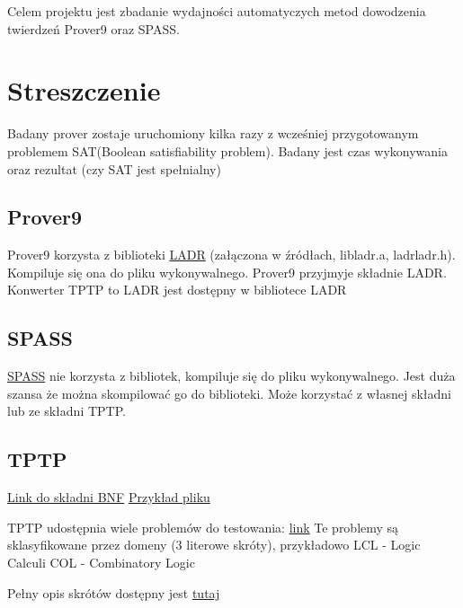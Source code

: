 \documentclass[a4paper,12pt]{article}
\begin{document}
Celem projektu jest zbadanie wydajności automatyczych metod dowodzenia twierdzeń Prover9 oraz SPASS.

		
\section{Streszczenie}

Badany prover zostaje uruchomiony kilka razy z wcześniej przygotowanym problemem SAT(Boolean satisfiability problem). Badany jest czas wykonywania oraz rezultat (czy SAT jest spełnialny)


\subsection{Prover9}
	Prover9 korzysta z biblioteki \href{https://www.cs.unm.edu/~mccune/prover9/manual/2009-11A/}{LADR} (załączona w źródłach, libladr.a, ladrladr.h). Kompiluje się ona do pliku wykonywalnego.
Prover9 przyjmyje składnie LADR. Konwerter TPTP to LADR jest dostępny w bibliotece LADR


\subsection{SPASS}
	\href{https://webspass.spass-prover.org/}{SPASS} nie korzysta z bibliotek, kompiluje się do pliku wykonywalnego.
Jest duża szansa że można skompilować go do biblioteki. Może korzystać z własnej składni lub ze składni TPTP.
\newpage
\subsection{TPTP}
	\noindent \href{http://www.tptp.org/TPTP/SyntaxBNF.html}{Link do składni BNF} \newline
	\href{http://www.tptp.org/cgi-bin/SeeTPTPCategory=Problems}{Przykład pliku}

TPTP udostępnia wiele problemów do testowania: \href{http://www.tptp.org/cgi-bin/SeeTPTP?Category=Problems}{link} \newline
Te problemy są sklasyfikowane przez domeny (3 literowe skróty), przykładowo \newline
LCL - Logic Calculi \newline
COL - Combinatory Logic

 Pełny opis skrótów dostępny jest \href{http://www.tptp.org/cgi-bin/SeeTPTP?Category=Documents&File=THFSynopsis}{tutaj}
 
\end{document}
